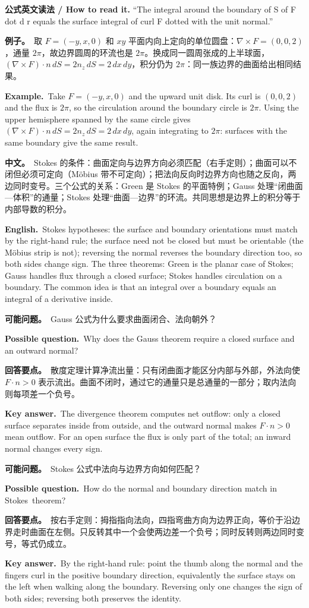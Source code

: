 \documentclass[UTF8,11pt,a4paper]{ctexart}
\newcommand{\BOTH}[2]{\par\noindent\textbf{中文。}\ #1\par\noindent\textbf{English.}\ #2\par}
\newcommand{\EX}[2]{\par\noindent\textbf{例子。}\ #1\par\noindent\textbf{Example.}\ #2\par}
\newcommand{\READ}[1]{\par\noindent\textbf{公式英文读法 / How to read it.} #1\par}
\newcommand{\ASK}[4]{\begin{samepage}\par\noindent\textbf{可能问题。}\ #1\par\noindent\textbf{Possible question.}\ #2\par\noindent\textbf{回答要点。}\ #3\par\noindent\textbf{Key answer.}\ #4\medskip\end{samepage}}
\begin{document}
\READ{“The integral around the boundary of S of F dot d r equals the surface integral of curl F dotted with the unit normal.”}
\EX{取 $F=(-y,x,0)$ 和 $xy$ 平面内向上定向的单位圆盘：$\nabla\times F=(0,0,2)$，通量 $2\pi$，故边界圆周的环流也是 $2\pi$。换成同一圆周张成的上半球面，$(\nabla\times F)\cdot n\,dS=2n_z\,dS=2\,dx\,dy$，积分仍为 $2\pi$：同一族边界的曲面给出相同结果。}{Take $F=(-y,x,0)$ and the upward unit disk. Its curl is $(0,0,2)$ and the flux is $2\pi$, so the circulation around the boundary circle is $2\pi$. Using the upper hemisphere spanned by the same circle gives $(\nabla\times F)\cdot n\,dS=2n_z\,dS=2\,dx\,dy$, again integrating to $2\pi$: surfaces with the same boundary give the same result.}
\BOTH{Stokes 的条件：曲面定向与边界方向必须匹配（右手定则）；曲面可以不闭但必须可定向（Möbius 带不可定向）；把法向反向时边界方向也随之反向，两边同时变号。三个公式的关系：Green 是 Stokes 的平面特例；Gauss 处理“闭曲面—体积”的通量；Stokes 处理“曲面—边界”的环流。共同思想是边界上的积分等于内部导数的积分。}{Stokes hypotheses: the surface and boundary orientations must match by the right-hand rule; the surface need not be closed but must be orientable (the Möbius strip is not); reversing the normal reverses the boundary direction too, so both sides change sign. The three theorems: Green is the planar case of Stokes; Gauss handles flux through a closed surface; Stokes handles circulation on a boundary. The common idea is that an integral over a boundary equals an integral of a derivative inside.}
\ASK{Gauss 公式为什么要求曲面闭合、法向朝外？}{Why does the Gauss theorem require a closed surface and an outward normal?}{散度定理计算净流出量：只有闭曲面才能区分内部与外部，外法向使 $F\cdot n>0$ 表示流出。曲面不闭时，通过它的通量只是总通量的一部分；取内法向则每项差一个负号。}{The divergence theorem computes net outflow: only a closed surface separates inside from outside, and the outward normal makes $F\cdot n>0$ mean outflow. For an open surface the flux is only part of the total; an inward normal changes every sign.}
\ASK{Stokes 公式中法向与边界方向如何匹配？}{How do the normal and boundary direction match in Stokes\textquotesingle\ theorem?}{按右手定则：拇指指向法向，四指弯曲方向为边界正向，等价于沿边界走时曲面在左侧。只反转其中一个会使两边差一个负号；同时反转则两边同时变号，等式仍成立。}{By the right-hand rule: point the thumb along the normal and the fingers curl in the positive boundary direction, equivalently the surface stays on the left when walking along the boundary. Reversing only one changes the sign of both sides; reversing both preserves the identity.}
\end{document}
